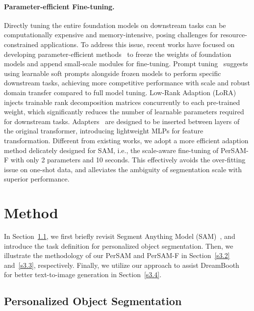 \documentclass{article} \usepackage{iclr2024_conference,times}
\begin{document}
\paragraph{Parameter-efficient Fine-tuning.} Directly tuning the entire foundation models on downstream tasks can be computationally expensive and memory-intensive, posing challenges for resource-constrained applications. To address this issue, recent works have focused on developing parameter-efficient methods~\citep{sung2022vl,he2022towards,rebuffi2017learning,qin2021learning} to freeze the weights of foundation models and append small-scale modules for fine-tuning. Prompt tuning~\citep{lester2021power, zhou2022learning, jia2022visual,liu2021p-tuning} suggests using learnable soft prompts alongside frozen models to perform specific downstream tasks, achieving more competitive performance with scale and robust domain transfer compared to full model tuning. Low-Rank Adaption (LoRA)~\citep{hu2021lora,stable-diffusion-lora,zhang2023adaptive,hedegaard2022structured} injects trainable rank decomposition matrices concurrently to each pre-trained weight, which significantly reduces the number of learnable parameters required for downstream tasks. Adapters~\citep{houlsby2019parameter,pfeiffer2020adapterfusion,lin2020exploring, chen2022vision} are designed to be inserted between layers of the original transformer, introducing lightweight MLPs for feature transformation. 
Different from existing works,
we adopt a more efficient adaption method delicately designed for SAM, i.e., the scale-aware fine-tuning of PerSAM-F with only 2 parameters and 10 seconds. This effectively avoids the over-fitting issue on one-shot data, and alleviates the ambiguity of segmentation scale with superior performance.


\section{Method}

In Section~\ref{s3.1}, we first briefly revisit Segment Anything Model (SAM)~\citep{kirillov2023segment}, and introduce the task definition for personalized object segmentation. Then, we illustrate the methodology of our PerSAM and PerSAM-F in Section~\ref{s3.2} and~\ref{s3.3}, respectively. Finally, we utilize our approach to assist DreamBooth~\citep{ruiz2022dreambooth} for better text-to-image generation in Section~\ref{s3.4}.

\subsection{Personalized Object Segmentation}
\label{s3.1}
\end{document}
